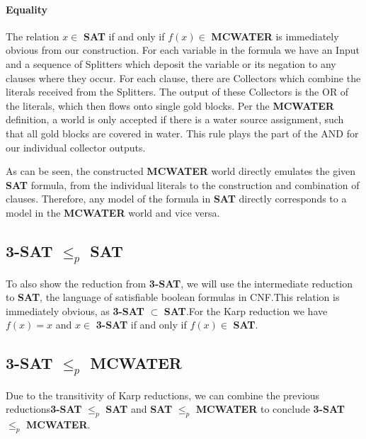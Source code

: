 \pagebreak

\paragraph{Equality}
The relation $x \in$ \textbf{SAT} if and only if $f(x) \in$ \textbf{MCWATER} is immediately obvious from our construction. For each variable in the formula we have an Input and a sequence of Splitters which deposit the variable or its negation to any clauses where they occur. For each clause, there are Collectors which combine the literals received from the Splitters. The output of these Collectors is the OR of the literals, which then flows onto single gold blocks. Per the \textbf{MCWATER} definition, a world is only accepted if there is a water source assignment, such that all gold blocks are covered in water. This rule plays the part of the AND for our individual collector outputs.
\linebreak

\noindent As can be seen, the constructed \textbf{MCWATER} world directly emulates the given \textbf{SAT} formula, from the individual literals to the construction and combination of clauses. Therefore, any model of the formula in \textbf{SAT} directly corresponds to a model in the \textbf{MCWATER} world and vice versa.



\subsection{3-SAT $\leq_p$ SAT}
To also show the reduction from \textbf{3-SAT}, we will use the intermediate reduction to \textbf{SAT}, the language of satisfiable boolean formulas in CNF.\newline This relation is immediately obvious, as \textbf{3-SAT} $\subset$ \textbf{SAT}.\newline For the Karp reduction we have $f(x) = x$ and $x \in$ \textbf{3-SAT} if and only if $f(x) \in$ \textbf{SAT}.



\subsection{3-SAT $\leq_p$ MCWATER}
Due to the transitivity of Karp reductions, we can combine the previous reductions\newline \textbf{3-SAT} $\leq_p$ \textbf{SAT} and \textbf{SAT} $\leq_p$ \textbf{MCWATER} to conclude \textbf{3-SAT} $\leq_p$ \textbf{MCWATER}.



